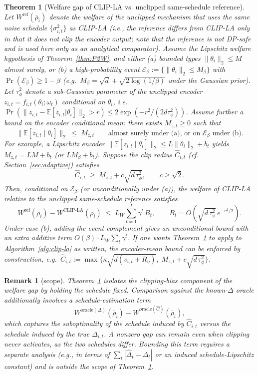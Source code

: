 \documentclass{article}
\newtheorem{theorem}{Theorem}
\newtheorem{remark}{Remark}
\begin{document}
\begin{theorem}[Welfare gap of CLIP-LA vs. unclipped same-schedule reference]
    \label{thm:CLIP-LA_wellfare}
    Let $W^{\mathrm{ref}}(\bar\rho_i)$ denote the welfare of the unclipped mechanism that uses the same noise schedule $\{\sigma_{i,t}^2\}$ as CLIP-LA (i.e., the reference differs from CLIP-LA only in that it does not clip the encoder output; note that the reference is not DP-safe and is used here only as an analytical comparator). Assume the Lipschitz welfare hypothesis of Theorem~\ref{thm:P2W}, and either (a) bounded types $\|\theta_i\|_2 \le M$ almost surely, or (b) a high-probability event $\mathcal{E}_\beta := \{\|\theta_i\|_2 \le M_\beta\}$ with $\Pr(\mathcal{E}_\beta) \ge 1 - \beta$ (e.g.\ $M_\beta = \sqrt{d} + \sqrt{2\log(1/\beta)}$ under the Gaussian prior). Let $\tau_\phi^2$ denote a sub-Gaussian parameter of the unclipped encoder $z_{i,t} = f_{i,t}(\theta_i; \omega_t)$ conditional on $\theta_i$, i.e.\ $\Pr(\|z_{i,t} - \mathbb{E}[z_{i,t}|\theta_i]\|_2 > r) \le 2\exp(-r^2/(2 d \tau_\phi^2))$. Assume further a bound on the encoder conditional mean: there exists $M_{z,t} \ge 0$ such that
    $$\|\mathbb{E}[z_{i,t} \mid \theta_i]\|_2 \;\le\; M_{z,t} \qquad \text{almost surely under (a), or on } \mathcal{E}_\beta \text{ under (b).}$$
    For example, a Lipschitz encoder $\|\mathbb{E}[z_{i,t}\mid\theta_i]\|_2 \le L\|\theta_i\|_2 + b_t$ yields $M_{z,t} = LM + b_t$ (or $LM_\beta + b_t$). Suppose the clip radius $\hat C_{i,t}$ (cf. Section~\ref{sec:adaptive}) satisfies
    $$\hat C_{i,t} \;\ge\; M_{z,t} + c\sqrt{d\,\tau_\phi^2}, \qquad c \ge \sqrt{2}.$$
    Then, conditional on $\mathcal{E}_\beta$ (or unconditionally under (a)), the welfare of CLIP-LA relative to the unclipped same-schedule reference satisfies
    $$W^{\mathrm{ref}}(\bar\rho_i) - W^{\mathrm{CLIP\text{-}LA}}(\bar\rho_i) \;\le\; L_W \sum_{t=1}^T \gamma^t\, B_t, \qquad B_t = O\!\left(\sqrt{d\,\tau_\phi^2}\, e^{-c^2/2}\right).$$
    Under case (b), adding the event complement gives an unconditional bound with an extra additive term $O(\beta)\cdot L_W \sum_t \gamma^t$. If one wants Theorem~\ref{thm:CLIP-LA_wellfare} to apply to Algorithm~\ref{alg:clip-la}  as written, the encoder-mean bound can be enforced by construction, e.g.\ $\hat C_{i,t} := \max\!\big\{\kappa\sqrt{d(v_{i,t}+R_\eta)},\; M_{z,t}+c\sqrt{d\,\tau_\phi^2}\big\}$.
\end{theorem}

\begin{remark}
    [scope]
    Theorem~\ref{thm:CLIP-LA_wellfare} isolates the clipping-bias component of the welfare gap by holding the schedule fixed. Comparison against the known-$\Delta$ oracle additionally involves a schedule-estimation term
    $$W^{\mathrm{oracle}(\Delta)}(\bar\rho_i) - W^{\mathrm{oracle}(\hat C)}(\bar\rho_i),$$
    which captures the suboptimality of the schedule induced by $\hat C_{i,t}$ versus the schedule induced by the true $\Delta_{i,t}$. A nonzero gap can remain even when clipping never activates, as the two schedules differ. Bounding this term requires a separate analysis (e.g., in terms of $\sum_t |\hat\Delta_t - \Delta_t|$ or an induced schedule-Lipschitz constant) and is outside the scope of Theorem~\ref{thm:CLIP-LA_wellfare}.
\end{remark}
\end{document}
